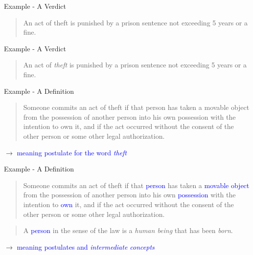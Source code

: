 \documentclass[]{beamer}
\begin{document}
\begin{frame}{Example - A Verdict}      
    \begin{quote}
        An act of theft is punished by a prison sentence not exceeding 5 years or a fine.
    \end{quote}
\end{frame}

\begin{frame}{Example - A Verdict}      
    \begin{quote}
        An act of \emph{theft} is punished by a prison sentence not exceeding 5 years or a fine.
    \end{quote}
\end{frame}

\begin{frame}{Example - A Definition} 
    \begin{quote}
        Someone commits an act of theft if that person has taken a movable object from the possession of another person into his own possession with the intention to own it, and if the act occurred without the consent of the other person or some other legal authorization.
    \end{quote}
 \hspace{1cm}
 
     $\rightarrow$ \textcolor{blue}{meaning postulate for the word \emph{theft}}
\end{frame}

\begin{frame}{Example - A Definition}
    \begin{quote}
        Someone commits an act of theft if that \textcolor{blue}{person} has taken a \textcolor{blue}{movable object} from the possession of another person into his own \textcolor{blue}{possession} with the intention to \textcolor{blue}{own} it, and if the act occurred without the consent of the other person or some other legal authorization.
    \end{quote}
\vspace{1cm}
    \begin{quote}
        A \textcolor{blue}{person} in the sense of the law is a \emph{human being} that has been \emph{born}.
    \end{quote}
    
\vspace{1cm}
\hspace{1cm}
    $\rightarrow$ \textcolor{blue}{meaning postulates and \emph{intermediate concepts}}
\end{frame}
\end{document}
